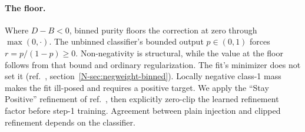 \paragraph{The floor.} Where $D-B<0$, binned purity floors the correction at zero through $\max(0,\cdot)$. The unbinned classifier's bounded output $p\in(0,1)$ forces $r=p/(1-p)\ge 0$. Non-negativity is structural, while the value at the floor follows from that bound and ordinary regularization. The fit's minimizer does not set it (ref.~\cite{AnalysisNote2026}, section~\ref*{N-sec:negweight-binned}). Locally negative class-1 mass makes the fit ill-posed and requires a positive target. We apply the ``Stay Positive'' refinement of ref.~\cite{Nachman:2025staypositive}, then explicitly zero-clip the learned refinement factor before step-1 training. Agreement between plain injection and clipped refinement depends on the classifier.


